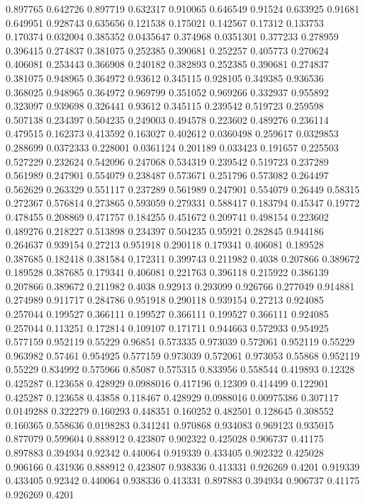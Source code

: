 0.897765 0.642726
0.897719 0.632317
0.910065 0.646549
0.91524 0.633925
0.91681 0.649951
0.928743 0.635656
0.121538 0.175021
0.142567 0.17312
0.133753 0.170374
0.032004 0.385352
0.0435647 0.374968
0.0351301 0.377233
0.278959 0.396415
0.274837 0.381075
0.252385 0.390681
0.252257 0.405773
0.270624 0.406081
0.253443 0.366908
0.240182 0.382893
0.252385 0.390681
0.274837 0.381075
0.948965 0.364972
0.93612 0.345115
0.928105 0.349385
0.936536 0.368025
0.948965 0.364972
0.969799 0.351052
0.969266 0.332937
0.955892 0.323097
0.939698 0.326441
0.93612 0.345115
0.239542 0.519723
0.259598 0.507138
0.234397 0.504235
0.249003 0.494578
0.223602 0.489276
0.236114 0.479515
0.162373 0.413592
0.163027 0.402612
0.0360498 0.259617
0.0329853 0.288699
0.0372333 0.228001
0.0361124 0.201189
0.033423 0.191657
0.225503 0.527229
0.232624 0.542096
0.247068 0.534319
0.239542 0.519723
0.237289 0.561989
0.247901 0.554079
0.238487 0.573671
0.251796 0.573082
0.264497 0.562629
0.263329 0.551117
0.237289 0.561989
0.247901 0.554079
0.26449 0.58315
0.272367 0.576814
0.273865 0.593059
0.279331 0.588417
0.183794 0.45347
0.19772 0.478455
0.208869 0.471757
0.184255 0.451672
0.209741 0.498154
0.223602 0.489276
0.218227 0.513898
0.234397 0.504235
0.95921 0.282845
0.944186 0.264637
0.939154 0.27213
0.951918 0.290118
0.179341 0.406081
0.189528 0.387685
0.182418 0.381584
0.172311 0.399743
0.211982 0.4038
0.207866 0.389672
0.189528 0.387685
0.179341 0.406081
0.221763 0.396118
0.215922 0.386139
0.207866 0.389672
0.211982 0.4038
0.92913 0.293099
0.926766 0.277049
0.914881 0.274989
0.911717 0.284786
0.951918 0.290118
0.939154 0.27213
0.924085 0.257044
0.199527 0.366111
0.199527 0.366111
0.199527 0.366111
0.924085 0.257044
0.113251 0.172814
0.109107 0.171711
0.944663 0.572933
0.954925 0.577159
0.952119 0.55229
0.96851 0.573335
0.973039 0.572061
0.952119 0.55229
0.963982 0.57461
0.954925 0.577159
0.973039 0.572061
0.973053 0.55868
0.952119 0.55229
0.834992 0.575966
0.85087 0.575315
0.833956 0.558544
0.419893 0.12328
0.425287 0.123658
0.428929 0.0988016
0.417196 0.12309
0.414499 0.122901
0.425287 0.123658
0.43858 0.118467
0.428929 0.0988016
0.00975386 0.307117
0.0149288 0.322279
0.160293 0.448351
0.160252 0.482501
0.128645 0.308552
0.160365 0.558636
0.0198283 0.341241
0.970868 0.934083
0.969123 0.935015
0.877079 0.599604
0.888912 0.423807
0.902322 0.425028
0.906737 0.41175
0.897883 0.394934
0.92342 0.440064
0.919339 0.433405
0.902322 0.425028
0.906166 0.431936
0.888912 0.423807
0.938336 0.413331
0.926269 0.4201
0.919339 0.433405
0.92342 0.440064
0.938336 0.413331
0.897883 0.394934
0.906737 0.41175
0.926269 0.4201
